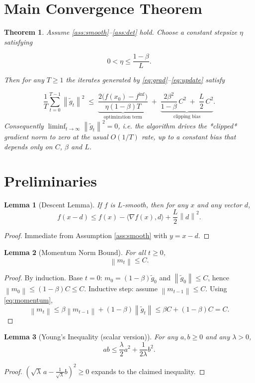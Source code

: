 \documentclass{article}
\newtheorem{theorem}{Theorem}
\newtheorem{lemma}{Lemma}
\newcommand{\norm}[1]{\left\lVert#1\right\rVert}
\newcommand{\grad}{\nabla}
\begin{document}
\section*{Main Convergence Theorem}
\begin{theorem}\label{thm:main}
Assume \ref{ass:smooth}–\ref{ass:det} hold. Choose a constant stepsize $\eta$ satisfying  

\[
0<\eta\le \frac{1-\beta}{L}. \tag{T1}
\]

Then for any $T\ge 1$ the iterates generated by \eqref{eq:grad}–\eqref{eq:update} satisfy  

\[
\frac{1}{T}\sum_{t=0}^{T-1}\norm{\tilde g_t}^{2}
\;\le\;
\underbrace{\frac{2\bigl(f(x_0)-f^{\inf}\bigr)}{\eta(1-\beta)T}}_{\displaystyle\text{optimization term}}
\;+\;
\underbrace{\frac{2\beta^{2}}{1-\beta}\,C^{2}
      \;+\;
      \frac{L}{2}\,C^{2}}_{\displaystyle\text{clipping bias}} .
\tag{T2}
\]
Consequently $\displaystyle\liminf_{t\to\infty}\norm{\tilde g_t}^{2}=0$, i.e. the algorithm drives the *clipped* gradient norm to zero at the usual $O(1/T)$ rate, up to a constant bias that depends only on $C$, $\beta$ and $L$.
\end{theorem}

\section*{Preliminaries}
\begin{lemma}[Descent Lemma]\label{lem:descent}
If $f$ is $L$‑smooth, then for any $x$ and any vector $d$,
\[
f(x-d)\le f(x)-\langle \grad f(x),d\rangle+\frac{L}{2}\norm{d}^2 .
\]
\end{lemma}
\begin{proof}
Immediate from Assumption \ref{ass:smooth} with $y=x-d$.
\end{proof}

\begin{lemma}[Momentum Norm Bound]\label{lem:momentum}
For all $t\ge0$,
\[
\norm{m_t}\le C .
\]
\end{lemma}
\begin{proof}
By induction. Base $t=0$: $m_0=(1-\beta)\tilde g_0$ and $\norm{\tilde g_0}\le C$, hence $\norm{m_0}\le (1-\beta)C\le C$.  
Inductive step: assume $\norm{m_{t-1}}\le C$. Using \eqref{eq:momentum},
\[
\norm{m_t}\le \beta\norm{m_{t-1}}+(1-\beta)\norm{\tilde g_t}
\le \beta C+(1-\beta)C = C .
\]
\end{proof}

\begin{lemma}[Young’s Inequality (scalar version)]\label{lem:young}
For any $a,b\ge0$ and any $\lambda>0$,
\[
ab\le\frac{\lambda}{2}a^{2}+\frac{1}{2\lambda}b^{2}.
\]
\end{lemma}
\begin{proof}
$(\sqrt{\lambda}\,a-\frac{1}{\sqrt{\lambda}}b)^{2}\ge0$ expands to the claimed inequality.
\end{proof}
\end{document}
